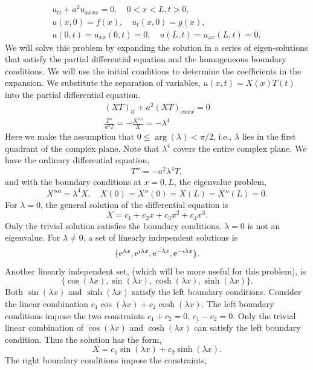 {%
\begin{Solution}
  \label{solution vibrations of a beam}
  \begin{gather*}
    u_{t t} + a^2 u_{x x x x} = 0, \quad 0 < x < L, t > 0, \\
    u(x,0) = f(x), \quad u_t(x,0) = g(x), \\
    u(0,t) = u_{x x}(0,t) = 0, \quad u(L,t) = u_{x x}(L,t) = 0, 
  \end{gather*}
  We will solve this problem by expanding the solution in a series of 
  eigen-solutions that satisfy the partial differential equation and the 
  homogeneous boundary conditions.  We will use the initial conditions
  to determine the coefficients in the expansion.
  We substitute the separation of variables, $u(x,t) = X(x) T(t)$ into the
  partial differential equation.
  \begin{gather*}
    (X T)_{t t} + a^2 (X T)_{x x x x} = 0 \\
    \frac{T''}{a^2 T} = - \frac{X''''}{X} = - \lambda^4
  \end{gather*}
  Here we make the assumption that $0 \leq \arg(\lambda) < \pi/2$, i.e.,
  $\lambda$ lies in the first quadrant of the complex plane.  Note that
  $\lambda^4$ covers the entire complex plane.
  We have the ordinary differential equation,
  \[
  T'' = - a^2 \lambda^4 T,
  \]
  and with the boundary conditions at $x = 0,L$, the eigenvalue problem,
  \[
  X'''' = \lambda^4 X, \quad X(0) = X''(0) = X(L) = X''(L) = 0.
  \]
  For $\lambda = 0$, the general solution of the differential equation is
  \[
  X = c_1 + c_2 x + c_3 x^2 + c_4 x^3.
  \]
  Only the trivial solution satisfies the boundary conditions.  $\lambda = 0$
  is not an eigenvalue.  For $\lambda \neq 0$, a set of linearly independent
  solutions is
  \[
  \{ \mathop{\mathrm{e}}\nolimits^{\lambda x}, \mathop{\mathrm{e}}\nolimits^{\imath \lambda x}, \mathop{\mathrm{e}}\nolimits^{- \lambda x}, \mathop{\mathrm{e}}\nolimits^{- \imath \lambda x} \}.
  \]
  Another linearly independent set, (which will be more useful for this problem),
  is
  \[
  \{ \cos(\lambda x), \sin(\lambda x), \cosh(\lambda x), \sinh(\lambda x) \}.
  \]
  Both $\sin(\lambda x)$ and $\sinh(\lambda x)$ satisfy the left boundary
  conditions.  Consider the linear combination $c_1 \cos(\lambda x) + 
  c_2 \cosh(\lambda x)$.  The left boundary conditions impose the 
  two constraints $c_1 + c_2 = 0$, $c_1 - c_2 = 0$.
  Only the trivial linear combination of $\cos(\lambda x)$ and 
  $\cosh(\lambda x)$ can satisfy the left boundary condition.  Thus the
  solution has the form,
  \[
  X = c_1 \sin(\lambda x) + c_2 \sinh(\lambda x).
  \]
  The right boundary conditions impose the constraints,

\end{Solution}}
